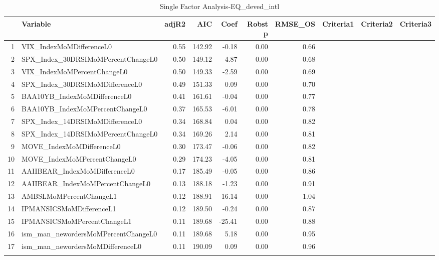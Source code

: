 \begin{longtable}{rlrrrrrlll}
  \hline
 & Variable & adjR2 & AIC & Coef & Robst p & RMSE\_OS & Criteria1 & Criteria2 & Criteria3 \\ 
  \hline
1 & VIX\_IndexMoMDifferenceL0 & 0.55 & 142.92 & -0.18 & 0.00 & 0.66 &  &  &  \\ 
  2 & SPX\_Index\_30DRSIMoMPercentChangeL0 & 0.50 & 149.12 & 4.87 & 0.00 & 0.68 &  &  &  \\ 
  3 & VIX\_IndexMoMPercentChangeL0 & 0.50 & 149.33 & -2.59 & 0.00 & 0.69 &  &  &  \\ 
  4 & SPX\_Index\_30DRSIMoMDifferenceL0 & 0.49 & 151.33 & 0.09 & 0.00 & 0.70 &  &  &  \\ 
  5 & BAA10YB\_IndexMoMDifferenceL0 & 0.41 & 161.61 & -0.04 & 0.00 & 0.77 &  &  &  \\ 
  6 & BAA10YB\_IndexMoMPercentChangeL0 & 0.37 & 165.53 & -6.01 & 0.00 & 0.78 &  &  &  \\ 
  7 & SPX\_Index\_14DRSIMoMDifferenceL0 & 0.34 & 168.84 & 0.04 & 0.00 & 0.82 &  &  &  \\ 
  8 & SPX\_Index\_14DRSIMoMPercentChangeL0 & 0.34 & 169.26 & 2.14 & 0.00 & 0.81 &  &  &  \\ 
  9 & MOVE\_IndexMoMDifferenceL0 & 0.30 & 173.47 & -0.06 & 0.00 & 0.82 &  &  &  \\ 
  10 & MOVE\_IndexMoMPercentChangeL0 & 0.29 & 174.23 & -4.05 & 0.00 & 0.81 &  &  &  \\ 
  11 & AAIIBEAR\_IndexMoMDifferenceL0 & 0.17 & 185.49 & -0.05 & 0.00 & 0.86 &  &  &  \\ 
  12 & AAIIBEAR\_IndexMoMPercentChangeL0 & 0.13 & 188.18 & -1.23 & 0.00 & 0.91 &  &  &  \\ 
  13 & AMBSLMoMPercentChangeL1 & 0.12 & 188.91 & 16.14 & 0.00 & 1.04 &  &  &  \\ 
  14 & IPMANSICSMoMDifferenceL1 & 0.12 & 189.50 & -0.24 & 0.00 & 0.87 &  &  &  \\ 
  15 & IPMANSICSMoMPercentChangeL1 & 0.11 & 189.68 & -25.41 & 0.00 & 0.88 &  &  &  \\ 
  16 & ism\_man\_newordersMoMPercentChangeL0 & 0.11 & 189.68 & 5.18 & 0.00 & 0.95 &  &  &  \\ 
  17 & ism\_man\_newordersMoMDifferenceL0 & 0.11 & 190.09 & 0.09 & 0.00 & 0.96 &  &  &  \\ 
   \hline
\hline
\caption{Single Factor Analysis-EQ_deved_intl} 
\end{longtable}
